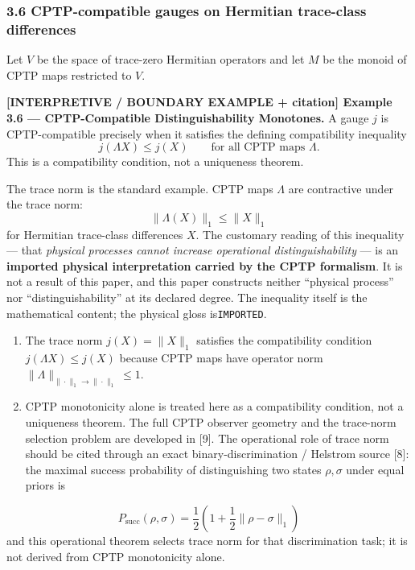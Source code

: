 \documentclass[
  11pt,
]{article}
\providecommand{\tightlist}{%
  \setlength{\itemsep}{0pt}\setlength{\parskip}{0pt}}
\providecommand{\tightlist}{%
  \setlength{\itemsep}{0pt}\setlength{\parskip}{0pt}}
\begin{document}
\subsubsection{3.6 CPTP-compatible gauges on Hermitian trace-class differences}\label{cptp-compatible-gauges-on-hermitian-trace-class-differences}

Let \(V\) be the space of trace-zero Hermitian operators and let \(M\) be the monoid of CPTP maps restricted to \(V\).

\textbf{{[}INTERPRETIVE / BOUNDARY EXAMPLE + citation{]} Example 3.6 --- CPTP-Compatible Distinguishability Monotones.} A gauge \(j\) is CPTP-compatible precisely when it satisfies the defining compatibility inequality
\[
j(\Lambda X)\le j(X)
\qquad
\text{for all CPTP maps }\Lambda.
\]
This is a compatibility condition, not a uniqueness theorem.

The trace norm is the standard example. CPTP maps \(\Lambda\) are contractive under the trace norm:
\[
\|\Lambda(X)\|_1 \leq \|X\|_1
\]
for Hermitian trace-class differences \(X\). The customary reading of this inequality --- that \emph{physical processes
cannot increase operational distinguishability} --- is an \textbf{imported physical interpretation carried by the CPTP
formalism}. It is not a result of this paper, and this paper constructs neither ``physical process'' nor
``distinguishability'' at its declared degree. The inequality itself is the mathematical content; the physical
gloss is\texttt{IMPORTED}.

\begin{enumerate}
\def\labelenumi{\arabic{enumi}.}
\tightlist
\item
  The trace norm \(j(X) = \|X\|_1\) satisfies the compatibility condition \(j(\Lambda X) \leq j(X)\) because CPTP maps have operator norm \(\| \Lambda \|_{\|\cdot\|_1 \to \|\cdot\|_1} \leq 1\).
\item
  CPTP monotonicity alone is treated here as a compatibility condition, not a uniqueness theorem. The full CPTP observer geometry and the trace-norm selection problem are developed in {[}9{]}. The operational role of trace norm should be cited through an exact binary-discrimination / Helstrom source {[}8{]}: the maximal success probability of distinguishing two states \(\rho,\sigma\) under equal priors is
\end{enumerate}

\[
P_{\mathrm{succ}}(\rho,\sigma)=\frac12\left(1+\frac12\|\rho-\sigma\|_1\right)
\]
and this operational theorem selects trace norm for that discrimination task; it is not derived from CPTP monotonicity alone.
\end{document}
